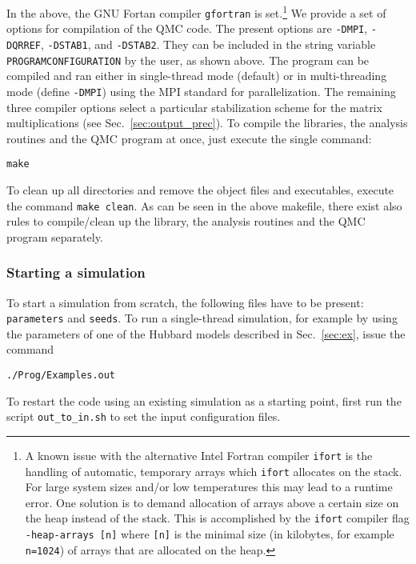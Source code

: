 In the above, the GNU Fortan compiler \texttt{gfortran} is set.\footnote{A known issue with the alternative Intel Fortran compiler \texttt{ifort} is the handling of automatic, temporary arrays 
which \texttt{ifort} allocates on the stack. For large system sizes and/or low temperatures this may lead to 
a runtime error. One solution is to demand allocation of arrays above a certain size on the heap instead of the stack. 
This is accomplished by the \texttt{ifort} compiler flag \texttt{-heap-arrays [n]} where \texttt{[n]} is the minimal size (in kilobytes, for example \texttt{n=1024}) of arrays 
that are allocated on the heap.}
We provide a set of options for compilation of the QMC code. The present options are \texttt{-DMPI}, \texttt{-DQRREF}, \texttt{-DSTAB1}, and \texttt{-DSTAB2}. 
They can be included in the string variable \texttt{PROGRAMCONFIGURATION} by the user, as shown above.
The program can be compiled and ran either in single-thread mode (default) or 
in multi-threading mode (define \texttt{-DMPI}) using the MPI standard for parallelization. The remaining three compiler options select a particular stabilization scheme for the matrix multiplications (see Sec.~\ref{sec:output_prec}).
To compile the libraries, the analysis routines and the QMC program at once, just execute the single command:
\begin{verbatim}
make
\end{verbatim}
To clean up all directories and remove the object files and executables, execute the command \texttt{make clean}. As can be seen in the above makefile, there exist also rules to compile/clean up the library, the analysis routines and the QMC program separately.  

%
\subsubsection{Starting a simulation}
%
To start a simulation from scratch, the following files have to be present: \texttt{parameters} and \texttt{seeds}. 
To run a single-thread simulation, for example by using the parameters of one of the  Hubbard models described in Sec.~\ref{sec:ex}, issue the command
\begin{verbatim}
./Prog/Examples.out
\end{verbatim}
To restart the code using an existing simulation as a starting point, first run the script \texttt{out\_to\_in.sh} to set 
the input configuration files.
%
